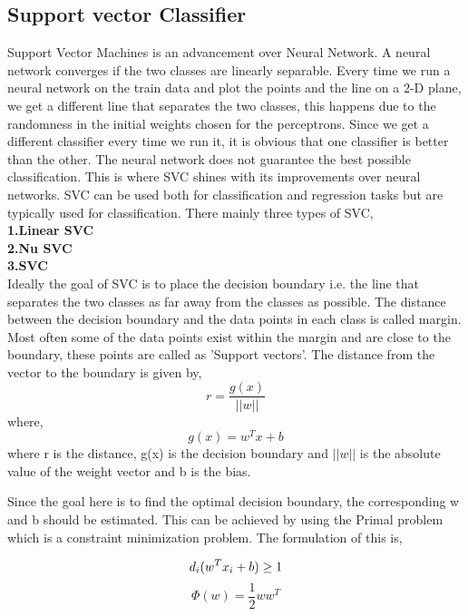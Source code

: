 \documentclass[sigconf]{acmart}
\begin{document}
\subsection{Support vector Classifier}
Support Vector Machines is an advancement over Neural Network. A neural network converges if the two classes are linearly separable. Every time we run a neural network on the train data and plot the points and the line on a 2-D plane, we get a different line that separates the two classes, this happens due to the randomness in the initial weights chosen for the perceptrons. Since we get a different classifier every time we run it, it is obvious that one classifier is better than the other. The neural network does not guarantee the best possible classification. This is where SVC shines with its improvements over neural networks. SVC can be used both for classification and regression tasks but are typically used for classification. There mainly three types of SVC,\\
\textbf{1.Linear SVC}\\
\textbf{2.Nu SVC}\\
\textbf{3.SVC}\\

Ideally the goal of SVC is to place the decision boundary i.e. the line that separates the two classes as far away from the classes as possible. The distance between the decision boundary and the data points in each class is called margin. Most often some of the data points exist within the margin and are close to the boundary, these points are called as 'Support vectors'. The distance from the vector to the boundary is given by,
\begin{equation}
    r = \frac{g(x)}{||w||}
\end{equation} 
where,
\begin{equation}
    g(x) = w^Tx+b
\end{equation}
where r is the distance, g(x) is the decision boundary and $||w||$ is the absolute value of the weight vector and b is the bias.

Since the goal here is to find the optimal decision boundary, the corresponding w and b should be estimated. This can be achieved by using the Primal problem which is a constraint minimization problem. The formulation of this is,

\begin{equation}
    d_i(w^Tx_i +b) \geq 1\\
\end{equation}
\begin{equation}
      \Phi(w) = \frac{1}{2}ww^T
\end{equation}
\end{document}
